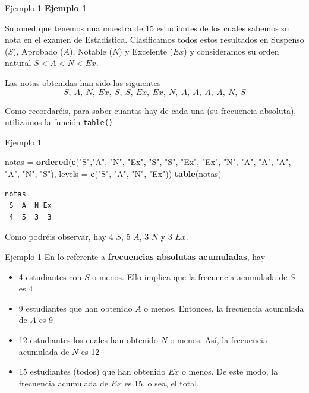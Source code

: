 \documentclass[
  ignorenonframetext,
]{beamer}
\newenvironment{Shaded}{\begin{snugshade}}{\end{snugshade}}
\newcommand{\AttributeTok}[1]{\textcolor[rgb]{0.13,0.29,0.53}{#1}}
\newcommand{\FunctionTok}[1]{\textcolor[rgb]{0.13,0.29,0.53}{\textbf{#1}}}
\newcommand{\NormalTok}[1]{#1}
\newcommand{\OtherTok}[1]{\textcolor[rgb]{0.56,0.35,0.01}{#1}}
\newcommand{\StringTok}[1]{\textcolor[rgb]{0.31,0.60,0.02}{#1}}
\providecommand{\tightlist}{%
  \setlength{\itemsep}{0pt}\setlength{\parskip}{0pt}}
\begin{document}
\begin{frame}[fragile]{Ejemplo 1}
\label{ejemplo-1-4}
\textbf{Ejemplo 1}

Suponed que tenemos una muestra de 15 estudiantes de los cuales sabemos
su nota en el examen de Estadística. Clasificamos todos estos resultados
en Suspenso (\(S\)), Aprobado (\(A\)), Notable (\(N\)) y Excelente
(\(Ex\)) y consideramos su orden natural \(S<A<N<Ex\).

Las notas obtenidas han sido las siguientes
\[S,\ A,\ N,\ Ex,\ S,\ S,\ Ex,\ Ex,\ N,\ A,\ A,\ A,\ A,\ N,\ S\]

Como recordaréis, para saber cuantas hay de cada una (su frecuencia
absoluta), utilizamos la función \texttt{table()}
\end{frame}

\begin{frame}[fragile]{Ejemplo 1}
\label{ejemplo-1-5}
\begin{Shaded}
\begin{Highlighting}[]
\NormalTok{notas }\OtherTok{=} \FunctionTok{ordered}\NormalTok{(}\FunctionTok{c}\NormalTok{(}\StringTok{"S"}\NormalTok{,}\StringTok{"A"}\NormalTok{, }\StringTok{"N"}\NormalTok{, }\StringTok{"Ex"}\NormalTok{, }\StringTok{"S"}\NormalTok{, }\StringTok{"S"}\NormalTok{, }\StringTok{"Ex"}\NormalTok{, }\StringTok{"Ex"}\NormalTok{, }\StringTok{"N"}\NormalTok{, }\StringTok{"A"}\NormalTok{, }\StringTok{"A"}\NormalTok{, }\StringTok{"A"}\NormalTok{,}
                  \StringTok{"A"}\NormalTok{, }\StringTok{"N"}\NormalTok{, }\StringTok{"S"}\NormalTok{), }\AttributeTok{levels =} \FunctionTok{c}\NormalTok{(}\StringTok{"S"}\NormalTok{, }\StringTok{"A"}\NormalTok{, }\StringTok{"N"}\NormalTok{, }\StringTok{"Ex"}\NormalTok{))}
\FunctionTok{table}\NormalTok{(notas)}
\end{Highlighting}
\end{Shaded}

\begin{verbatim}
notas
 S  A  N Ex 
 4  5  3  3 
\end{verbatim}

Como podréis observar, hay 4 \(S\), 5 \(A\), 3 \(N\) y 3 \(Ex\).
\end{frame}

\begin{frame}{Ejemplo 1}
\label{ejemplo-1-6}
En lo referente a \textbf{frecuencias absolutas acumuladas}, hay

\begin{itemize}
\tightlist
\item
  4 estudiantes con \(S\) o menos. Ello implica que la frecuencia
  acumulada de \(S\) es 4
\item
  9 estudiantes que han obtenido \(A\) o menos. Entonces, la frecuencia
  acumulada de \(A\) es 9
\item
  12 estudiantes los cuales han obtenido \(N\) o menos. Así, la
  frecuencia acumulada de \(N\) es 12
\item
  15 estudiantes (todos) que han obtenido \(Ex\) o menos. De este modo,
  la frecuencia acumulada de \(Ex\) es 15, o sea, el total.
\end{itemize}
\end{frame}
\end{document}
